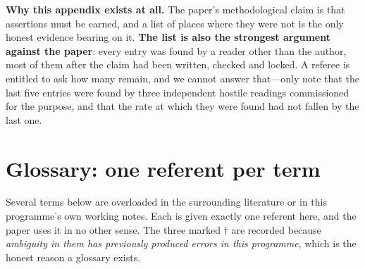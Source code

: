 \documentclass[11pt,reqno]{amsart}
\theoremstyle{plain}
\theoremstyle{definition}
\theoremstyle{remark}
\begin{document}
\textbf{Why this appendix exists at all.} The paper's methodological claim is that
assertions must be earned, and a list of places where they were not is the only honest
evidence bearing on it. \textbf{The list is also the strongest argument against the
paper}: every entry was found by a reader other than the author, most of them after the
claim had been written, checked and locked. A referee is entitled to ask how many remain,
and we cannot answer that---only note that the last five entries were found by three
independent hostile readings commissioned for the purpose, and that the rate at which
they were found had not fallen by the last one.

\section{Glossary: one referent per term}\label{app:glossary}

Several terms below are overloaded in the surrounding literature or in this programme's
own working notes. Each is given exactly one referent here, and the paper uses it in no
other sense. The three marked $\dagger$ are recorded because \emph{ambiguity in them has
previously produced errors in this programme}, which is the honest reason a glossary
exists.
\end{document}
